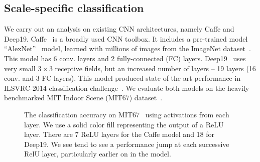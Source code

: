 \documentclass[10pt,twocolumn,letterpaper]{article}
\begin{document}
\subsection{Scale-specific classification}
We carry out an analysis on existing CNN architectures, namely Caffe and Deep19. Caffe~\cite{Caffe} is a broadly used CNN toolbox. It includes a pre-trained model ``AlexNet''~\cite{AlexNet} model, learned with millions of images from the ImageNet dataset~\cite{ImageNet}. This model has 6 conv. layers and 2 fully-connected (FC) layers. Deep19~\cite{veryDeep} uses very small $3\times 3$ receptive fields, but an increased number of layers -- 19 layers (16 conv. and 3 FC layers). This model produced state-of-the-art performance in ILSVRC-2014 classification challenge~\cite{ILSVRC14}. We evaluate both models on the heavily benchmarked MIT Indoor Scene (MIT67) dataset~\cite{MIT67}.

\begin{figure}[htbp]
\centering
\caption{The classification accuracy on MIT67~\cite{MIT67} using activations from each layer. We use a solid color fill representing the output of a ReLU layer. There are 7 ReLU layers for the Caffe model and 18 for Deep19. We see tend to see a performance jump at each successive RelU layer, particularly earlier on in the model.}
\label{fig:layer_MIT67}
\end{figure}
\end{document}
